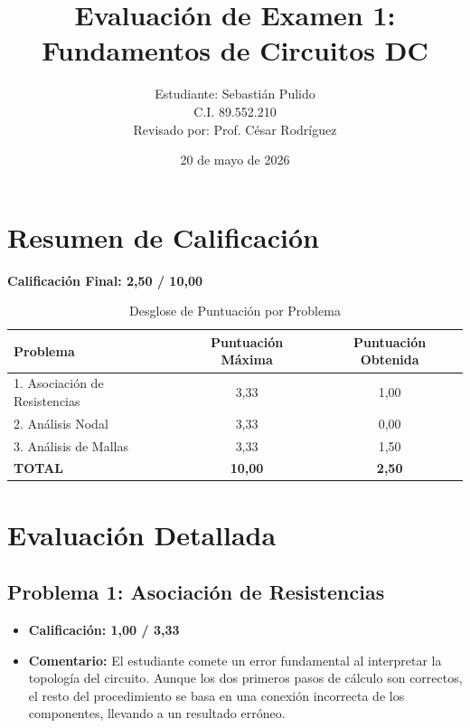 \documentclass[12pt,a4paper]{article}
\title{Evaluación de Examen 1: Fundamentos de Circuitos DC}
\author{Estudiante: Sebastián Pulido \\ \small{C.I. 89.552.210} \\ \vspace{0.5cm} \large{Revisado por: Prof. César Rodríguez}}
\date{20 de mayo de 2026}
\begin{document}
\maketitle

\section*{Resumen de Calificación}

\begin{center}
    \huge \textbf{Calificación Final: 2,50 / 10,00}
\end{center}

\vspace{1cm}

\begin{table}[H]
    \centering
    \caption{Desglose de Puntuación por Problema}
    \label{tab:calificaciones}
    \begin{tabular}{@{}lcc@{}}
    \toprule
    \textbf{Problema} & \textbf{Puntuación Máxima} & \textbf{Puntuación Obtenida} \\
    \midrule
    1. Asociación de Resistencias & 3,33 & 1,00 \\
    2. Análisis Nodal & 3,33 & 0,00 \\
    3. Análisis de Mallas & 3,33 & 1,50 \\
    \midrule
    \textbf{TOTAL} & \textbf{10,00} & \textbf{2,50} \\
    \bottomrule
    \end{tabular}
\end{table}

\newpage

\section{Evaluación Detallada}

\subsection{Problema 1: Asociación de Resistencias}

\begin{itemize}
    \item \textbf{Calificación: 1,00 / 3,33}
    \item \textbf{Comentario:} El estudiante comete un error fundamental al interpretar la topología del circuito. Aunque los dos primeros pasos de cálculo son correctos, el resto del procedimiento se basa en una conexión incorrecta de los componentes, llevando a un resultado erróneo.
\end{itemize}
\end{document}
